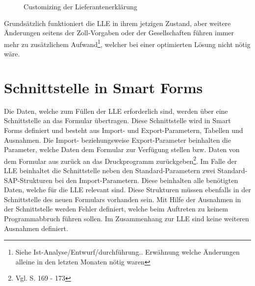 		
	\begin{figure}[ht]
		\centering
		\caption{Customizing der Lieferantenerklärung }
		\label{fig4}
	\end{figure}

	Grundsätzlich funktioniert die \ac{LLE} in ihrem jetzigen Zustand, aber weitere Änderungen seitens der Zoll-Vorgaben oder der Gesellschaften führen immer mehr zu zusätzlichem Aufwand\footnote{Siehe Ist-Analyse/Entwurf/durchführung.. Erwähnung welche Änderungen alleine in den letzten Monaten nötig waren}, welcher bei einer optimierten Lösung nicht nötig wäre. 

	\FloatBarrier
	
	\section{Schnittstelle in Smart Forms}
	
	Die Daten, welche zum Füllen der \ac{LLE} erforderlich sind, werden über eine Schnittstelle an das Formular übertragen. Diese Schnittstelle wird in Smart Forms definiert und besteht aus Import- und Export-Parametern, Tabellen und Ausnahmen. Die Import- beziehungsweise Export-Parameter beinhalten die Parameter, welche Daten dem Formular zur Verfügung stellen bzw. Daten von dem Formular aus zurück an das Druckprogramm zurückgeben\footnote{Vgl. \cite{Hertleif.2003} S. 169 - 173}. Im Falle der \ac{LLE} beinhaltet die Schnittstelle neben den Standard-Parametern zwei Standard-SAP-Strukturen bei den Import-Parametern. Diese beinhalten alle benötigten Daten, welche für die \ac{LLE} relevant sind. Diese Strukturen müssen ebenfalls in der Schnittstelle des neuen Formulars vorhanden sein. Mit Hilfe der Ausnahmen in der Schnittstelle werden Fehler definiert, welche beim Auftreten zu keinem Programmabbruch führen sollen. Im Zusammenhang zur \ac{LLE} sind keine weiteren Ausnahmen definiert.    
